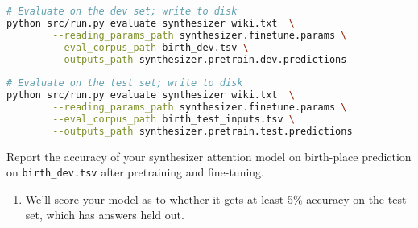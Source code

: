 \begin{enumerate}[(a)]
\begin{lstlisting}[language=bash]
# Evaluate on the dev set; write to disk
python src/run.py evaluate synthesizer wiki.txt  \
        --reading_params_path synthesizer.finetune.params \
        --eval_corpus_path birth_dev.tsv \
        --outputs_path synthesizer.pretrain.dev.predictions
        
# Evaluate on the test set; write to disk
python src/run.py evaluate synthesizer wiki.txt  \
        --reading_params_path synthesizer.finetune.params \
        --eval_corpus_path birth_test_inputs.tsv \
        --outputs_path synthesizer.pretrain.test.predictions
\end{lstlisting}

Report the accuracy of your synthesizer attention model on birth-place prediction on \texttt{birth\_dev.tsv} after pretraining and fine-tuning.

    
    \begin{enumerate}
    \item We'll score your model as to whether it gets at least 5\% accuracy on the test set, which has answers held out.
    \end{enumerate}

\end{enumerate}

\begin{answer}
\end{answer}
